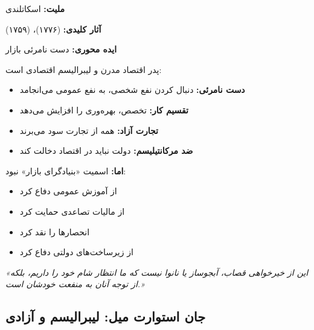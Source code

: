 \begin{personbox}

\textbf{ملیت:} اسکاتلندی

\textbf{آثار کلیدی:}  (۱۷۷۶)،  (۱۷۵۹)

\textbf{ایده محوری:} دست نامرئی بازار

\mediumspace

 پدر اقتصاد مدرن و لیبرالیسم اقتصادی است:

\begin{itemize}[nosep]
    \item \textbf{دست نامرئی:} دنبال کردن نفع شخصی، به نفع عمومی می‌انجامد
    \item \textbf{تقسیم کار:} تخصص، بهره‌وری را افزایش می‌دهد
    \item \textbf{تجارت آزاد:} همه از تجارت سود می‌برند
    \item \textbf{ضد مرکانتیلیسم:} دولت نباید در اقتصاد دخالت کند
\end{itemize}

\mediumspace

\textbf{اما:} اسمیت «بنیادگرای بازار» نبود:
\begin{itemize}[nosep]
    \item از آموزش عمومی دفاع کرد
    \item از مالیات تصاعدی حمایت کرد
    \item انحصارها را نقد کرد
    \item از زیرساخت‌های دولتی دفاع کرد
\end{itemize}
\end{personbox}

\begin{quotebox}
\textit{«این از خیرخواهی قصاب، آبجوساز یا نانوا نیست که ما انتظار شام خود را داریم، بلکه از توجه آنان به منفعت خودشان است.»}
\end{quotebox}

\subsection{جان استوارت میل: لیبرالیسم و آزادی}

